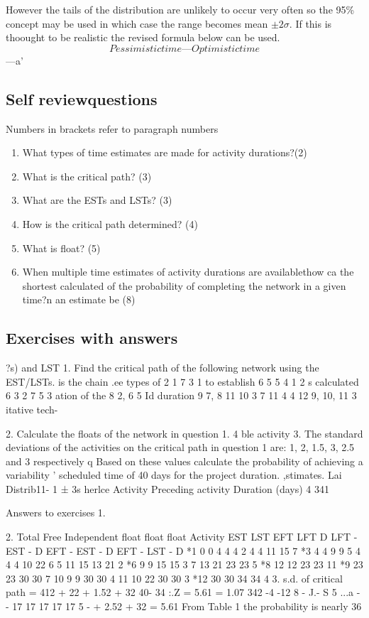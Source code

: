 \documentclass[]{report}
\begin{document}
However the tails of the distribution are unlikely to occur very often so the 95\% 
concept may be used in which case the range becomes mean $\pm 2 \sigma$. If this is thoought to
be realistic the revised formula below can be used.  
\[Pessimistic time — Optimistic time   \]
—a' 
\subsection{Self reviewquestions} Numbers in brackets refer to paragraph numbers 
\begin{enumerate}
	\item What types of time estimates are made for activity durations?(2) 
	\item What is the critical path? (3) 
	\item What are the ESTs and LSTs? (3) 
	\item How is the critical path determined? (4) 
	\item What is float? (5) 
	\item When multiple time estimates of activity durations are availablethow ca 
	the shortest calculated of the probability of completing the network in a given time?n an estimate be 
	(8)
\end{enumerate}
 
\subsection{Exercises with answers} 
?s) and LST 1. Find the critical path of the following network using the EST/LSTs. 
is the chain 
.ee types of 
2 
1 
7 
3 
1 
to establish 
6 
5 
5 
4 
1 
2 
s calculated 
6 3 2 
7 5 3 
ation of the 
8 
2, 6 5 
Id duration 
9 
7, 8 11 
10 
3 7 
11 
4 4 
12 9, 10, 11 3 
itative tech- 

2. Calculate the floats of the network in question 1. 4 
ble activity 3. The standard deviations of the activities on the critical path in question 1 are: 1, 2, 1.5, 3, 
2.5 and 3 respectively q 
Based on these values calculate the probability of achieving a variability ' scheduled time of 40 days for the project duration. 
,stimates. 
Lai Distrib11- 
1 ± 3s herlce 
Activity Preceding activity Duration (days) 
4 
341 

Answers to exercises 1. 

2. Total Free Independent float float float Activity EST LST EFT LFT D LFT - EST - D EFT - EST - D EFT - LST - D 
*1 0 0 4 4 4 2 4 4 11 15 7 *3 4 4 9 9 5 4 4 4 10 22 6 5 11 15 13 21 2 *6 9 9 15 15 3 7 13 21 23 23 5 *8 12 12 23 23 11 *9 23 23 30 30 7 10 9 9 30 30 4 11 10 22 30 30 3 *12 30 30 34 34 4 
3. s.d. of critical path = 412 + 22 + 1.52 + 32 40- 34 :.Z = 5.61 = 1.07 
342 
-4 -12 8 - J.- S 5 ...a - - 17 17 17 17 17 5 - + 2.52 + 32 = 5.61 
From Table 1 the probability is nearly 36%


\end{document}

